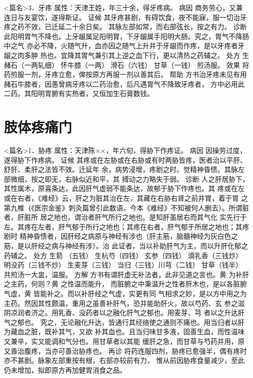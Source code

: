 \documentclass[a4paper,12pt,UTF8,twoside]{ctexbook}
\begin{document}
<篇名>3．牙疼
属性：天津王姓，年三十余，得牙疼病。 
病因 商务劳心，又兼连日与友宴饮，遂得斯证。 
证候 其牙疼甚剧，有碍饮食，夜不能寐，服一切治牙疼之药不效，已迁延二十余日矣。 
其脉左部如常，而右部弦长，按之有力。 
诊断 此阳明胃气不降也。上牙龈属足阳明胃，下牙龈属手阳明大肠。究之，胃气不降肠中之气 
亦必不降，火随气升，血亦因之随气上升并于牙龈而作疼，是以牙疼者牙龈之肉多肿 
热也。宜降其胃气兼引其上逆之血下行，更以清热之药辅之。 
处方 生赭石（一两轧细） 怀牛膝（一两） 滑石（六钱） 甘草（一钱） 
煎汤服。 
效果 将药煎服一剂，牙疼立愈，俾按原方再服一剂以善其后。 
帮助 方书治牙疼未见有用赭石牛膝者，因愚曾病牙疼以二药治愈，后凡遇胃气不降致牙疼者， 
方中必用此二药。其阳明胃腑有实热者，又恒加生石膏数钱。 

\chapter{肢体疼痛门}
<篇名>1．胁疼
属性：天津陈××，年六旬，得胁下作疼证。 
病因 因操劳过度，遂得胁下作疼病。 
证候 其疼或在左胁或在右胁或有时两胁皆疼，医者治以平肝、舒肝、柔肝之法皆不效。迁延年 
余，病势浸增，疼剧之时。觉精神昏愦。其脉左部微细，按之即无，右脉似近和平，其 
搏动之力略失于弱。 
诊断 人之肝居胁下，其性属木，原喜条达，此因肝气虚弱不能条达，故郁于胁下作疼也。其 
疼或在左或在右者，《难经》云，肝之为脏其治在左，其藏在右胁右肾之前并胃，着于胃 
之第九椎（《医宗金鉴》刺灸篇曾引此数语，今本《难经》不知被何人删去）。所谓脏者，肝脏所 
居之地也，谓治者肝气所行之地也。是知肝虽居右而其气化 
实先行于左。其疼在左者，肝气郁于所行之地也；其疼在右者，肝气郁于所居之地也；其疼剧时 
精神昏愦者，因肝经之病原与神经有涉也（肝主筋，脑髓神经为灰白色之筋，是以肝经之病与神经有涉）。治 
此证者，当以补助肝气为主。而以升肝化郁之药辅之。 
处方 生箭 （五钱） 生杭芍（四钱） 玄参（四钱） 滴乳香（三钱炒） 
明没药（三钱不炒） 生麦芽（三钱） 当归（三钱）川芎（二钱） 甘草（钱半） 
共煎汤一大盅，温服。 
方解 方书有谓肝虚无补法者，此非见道之言也。黄 为补肝之主药，何则？黄 之性温而能升， 
而脏腑之中秉温升之性者肝木也，是以各脏腑气虚，黄 皆能补之。而以补肝经之气虚，实更有同 
气相求之妙，是以方中用之为主药。然因其性颇温，重用之虽善补肝气，恐并能助肝火，故以芍药、玄 
参之滋阴凉润者济之。用乳香、没药者以之融化肝气之郁也。用麦芽、芎 者以之升达肝气之郁也。 
究之，无论融化升达，皆通行其经络使之通则不痛也。用当归者以肝为藏血之脏，既补其气，又欲 
补其血也。且当归味甘多液，固善生血，而性温味又兼辛，实又能调和气分也。用甘草者以其能 
缓肝之急，而甘草与芍药并用，原又善治腹疼，当亦可善治胁疼也。 
再诊 将药连服四剂，胁疼已愈强半，偶有疼时亦不甚剧。脉象左部重按有根，右部亦较前有力， 
惟从前因胁疼食量减少，至此仍未增加，拟即原方再加健胃消食之品。 
\end{document}

